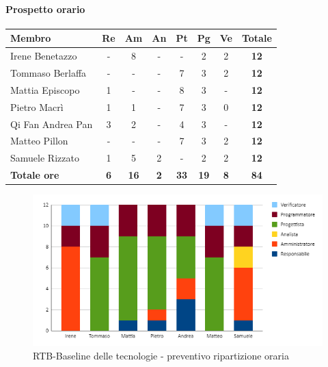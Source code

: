 \paragraph{Prospetto orario}
\begin{center}
	\renewcommand{\arraystretch}{1.8} %
	\begin{tabular}{ |m{10em}|c|c|c|c|c|c|c| }
	\hline
	\textbf{Membro} & \textbf{Re} & \textbf{Am} &  \textbf{An} &  \textbf{Pt} &  \textbf{Pg} &  \textbf{Ve} &  \textbf{Totale}\\
    \hline
    Irene Benetazzo   & - & 8 & - & - & 2 & 2 & \textbf{12} \\
    \hline
    Tommaso Berlaffa  & - & - & - & 7 & 3 & 2 & \textbf{12} \\
    \hline
    Mattia Episcopo   & 1 & - & - & 8 & 3 & - & \textbf{12} \\
    \hline
    Pietro Macrì      & 1 & 1 & - & 7 & 3 & 0 & \textbf{12} \\
    \hline
    Qi Fan Andrea Pan & 3 & 2 & - & 4 & 3 & - & \textbf{12} \\
    \hline
    Matteo Pillon     & - & - & - & 7 & 3 & 2 & \textbf{12} \\
    \hline
    Samuele Rizzato   & 1 & 5 & 2 & - & 2 & 2 & \textbf{12} \\
    \hline
    \textbf{Totale ore} & \textbf{6} & \textbf{16} &  \textbf{2} &  \textbf{33} &  \textbf{19} &  \textbf{8} &  \textbf{84}\\
    \hline
	\end{tabular}
\end{center}
\begin{figure}[H]
    \centering\includegraphics[width=\textwidth, height=\textheight,keepaspectratio]{images/preventivo/RTB-tecnologico-ore.png}
    \caption{RTB-Baseline delle tecnologie - preventivo ripartizione oraria}
\end{figure}

